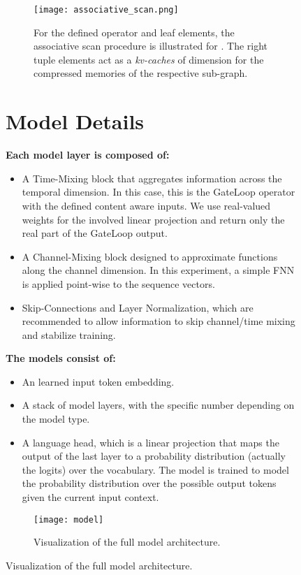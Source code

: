 \documentclass{article} \usepackage{iclr2024_conference,times}
\begin{document}
\begin{figure}[H]
\begin{minipage}{0.6\textwidth}
\begin{figure}[H]
\begin{center}
\texttt{[image: associative\_scan.png]}
\end{center}
\caption{For the defined operator and leaf elements, the associative scan procedure is illustrated for . The right tuple elements act as a \textit{kv-caches} of dimension  for the compressed memories of the respective sub-graph.}
\label{fig:associative_scan}
\end{figure}

\newpage


\section{Model Details}\label{sec:model}

\textbf{Each model layer is composed of:}
\begin{itemize}
\item A Time-Mixing block that aggregates information across the temporal dimension. In this case, this is the GateLoop operator with the defined content aware inputs. We use real-valued weights for the involved linear projection and return only the real part of the GateLoop output. 
\item A Channel-Mixing block designed to approximate functions along the channel dimension. In this experiment, a simple FNN is applied point-wise to the sequence vectors.
\item Skip-Connections and Layer Normalization, which are recommended to allow information to skip channel/time mixing and stabilize training.
\end{itemize}
\textbf{The models consist of:}
\begin{itemize}
\item An learned input token embedding.
\item A stack of  model layers, with the specific number depending on the model type.
\item A language head, which is a linear projection that maps the output of the last layer to a probability distribution (actually the logits) over the vocabulary. The model is trained to model the probability distribution over the possible output tokens given the current input context.
\end{itemize}

\begin{figure}[H]
\centering
\texttt{[image: model]}
\caption{Visualization of the full model architecture.}
\end{figure}



\end{minipage}
\end{figure}
\end{document}
